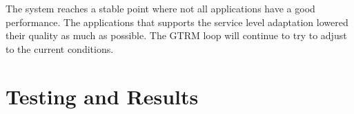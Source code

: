 \documentclass[nobiblatex]{LTHthesis}
\begin{document}
The system reaches a stable point where not all applications have a good
performance. The applications that supports the service level adaptation 
lowered their quality as much as possible. The GTRM loop will continue to
try to adjust to the current conditions.

\chapter{Testing and Results}
\label{chp:test}

\end{document}
